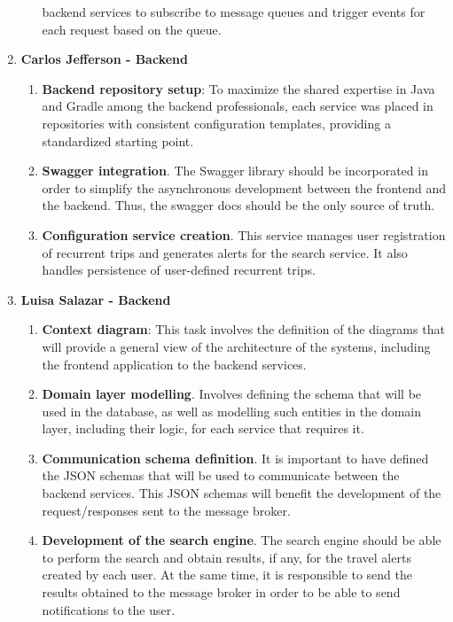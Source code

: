 \documentclass[../memory.tex]{subfiles}
\begin{document}
\begin{enumerate}[label =]
\begin{enumerate}[label = -]
		backend services to subscribe to message queues and trigger events for
		each request based on the queue.
	\end{enumerate}
	\item\textbf{Carlos Jefferson - Backend}
	\begin{enumerate}[label = -]
		\item\textbf{Backend repository setup}: To maximize the shared expertise
		in Java and Gradle among the backend professionals, each service was
		placed in repositories with consistent configuration templates,
		providing a standardized starting point.
		\item\textbf{Swagger integration}. The Swagger library should be
		incorporated in order to simplify the asynchronous development between
		the frontend and the backend. Thus, the swagger docs should be the
		only source of truth.
		\item\textbf{Configuration service creation}. This service manages user
		registration of recurrent trips and generates alerts for the search
		service. It also handles persistence of user-defined recurrent trips.
	\end{enumerate}
	\item\textbf{Luisa Salazar - Backend}
	\begin{enumerate}[label = -]
		\item\textbf{Context diagram}: This task involves the definition of the
		diagrams that will provide a general view of the architecture of the
		systems, including the frontend application to the backend services.
		\item\textbf{Domain layer modelling}. Involves defining the schema that
		will be used in the database, as well as modelling such entities in
		the domain layer, including their logic, for each service that
		requires it.
		\item\textbf{Communication schema definition}. It is important to have
		defined the JSON schemas that will be used to communicate between the
		backend services. This JSON schemas will benefit the development of
		the request/responses sent to the message broker.
		\item\textbf{Development of the search engine}. The search engine should
		be able to perform the search and obtain results, if any, for the
		travel alerts created by each user. At the same time, it is
		responsible to send the results obtained to the message broker in
		order to be able to send notifications to the user.
	\end{enumerate}
\end{enumerate}
\end{document}
